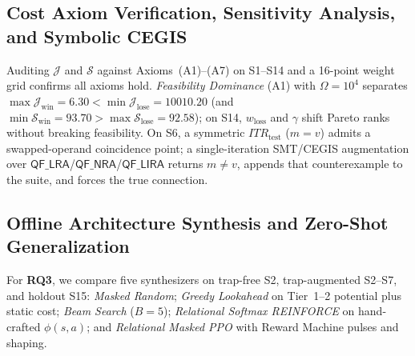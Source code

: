 \subsection{Cost Axiom Verification, Sensitivity Analysis, and Symbolic CEGIS} \label{sec:res-cost}

Auditing $\mathcal{J}$ and $\mathcal{S}$ against Axioms~(A1)--(A7) on S1--S14 and a 16-point weight grid confirms all axioms hold.  \emph{Feasibility Dominance} (A1) with $\Omega = 10^{4}$ separates $\max\mathcal{J}_{\text{win}} = 6.30 < \min\mathcal{J}_{\text{lose}} = 10010.20$ (and $\min\mathcal{S}_{\text{win}} = 93.70 > \max\mathcal{S}_{\text{lose}} = 92.58$); on S14, $w_{\text{loss}}$ and $\gamma$ shift Pareto ranks without breaking feasibility.  On S6, a symmetric $ITR_{\text{test}}$ ($m = v$) admits a swapped-operand coincidence point; a single-iteration SMT/CEGIS augmentation over $\mathsf{QF\_LRA}$/$\mathsf{QF\_NRA}$/$\mathsf{QF\_LIRA}$ returns $m \neq v$, appends that counterexample to the suite, and forces the true connection.

\subsection{Offline Architecture Synthesis and Zero-Shot Generalization} \label{sec:res-offline-rl}

For \textbf{RQ3}, we compare five synthesizers on trap-free S2, trap-augmented S2--S7, and holdout S15: \emph{Masked Random}; \emph{Greedy Lookahead} on Tier~1--2 potential plus static cost; \emph{Beam Search} ($B=5$); \emph{Relational Softmax REINFORCE} on hand-crafted $\phi(s, a)$; and \emph{Relational Masked PPO} with Reward Machine pulses and shaping.

